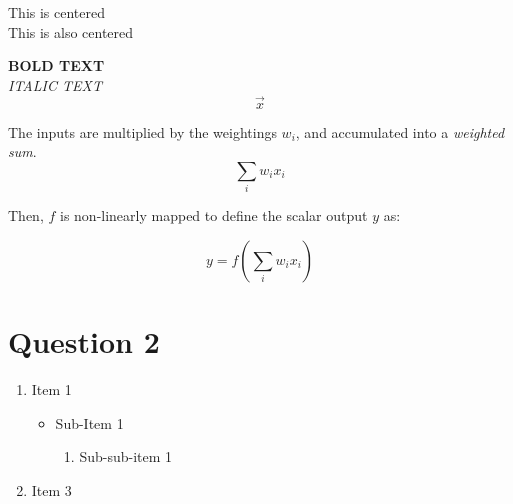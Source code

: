 \documentclass[10pt,a4paper]{article}
\begin{document}
{} \\

 \\

\begin{center}
This is centered \\
This is also centered
\end{center}



\flushleft\textbf{BOLD TEXT} \\

\flushleft\textit{ITALIC TEXT} \\

$$
\vec{x}
$$

The inputs are multiplied by the weightings $w_i$, and accumulated into a \emph{weighted sum}.
\[\sum_i{w_ix_i}\]

Then, $f$ is non-linearly mapped to define the scalar output $y$ as:

\begin{equation}
y = f(\sum_i{w_ix_i})
\end{equation}

\section*{Question 2}
\begin{enumerate}
	\item{Item 1}
    \begin{itemize}
    	\item{Sub-Item 1}
        \begin{enumerate}
        	\item{Sub-sub-item 1}
        \end{enumerate}
    \end{itemize}
    \item{Item 3}
\end{enumerate}
\end{document}
